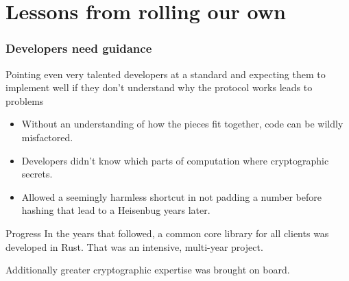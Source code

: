 \documentclass[xcolor={dvipsnames,table,hyperref}]{beamer}
\begin{document}
\section{Lessons from rolling our own}

\begin{frame}
  \frametitle{Developers need guidance}
  Pointing even very talented developers at a standard and expecting them
  to implement well if they don't understand why the protocol works leads to problems
  \begin{itemize}
    \item Without an understanding of how the pieces fit together, code can be wildly misfactored.
    \item Developers didn't know which parts of computation where cryptographic secrets.
    \item Allowed a seemingly harmless shortcut in not padding a number before hashing that lead to a Heisenbug years later.
  \end{itemize}

\end{frame}

\begin{frame}{Progress}
  In the years that followed, a common core library for all clients was developed in Rust. That was an intensive, multi-year project. 
  
  Additionally greater cryptographic expertise was brought on board.
\end{frame}


\end{document}
